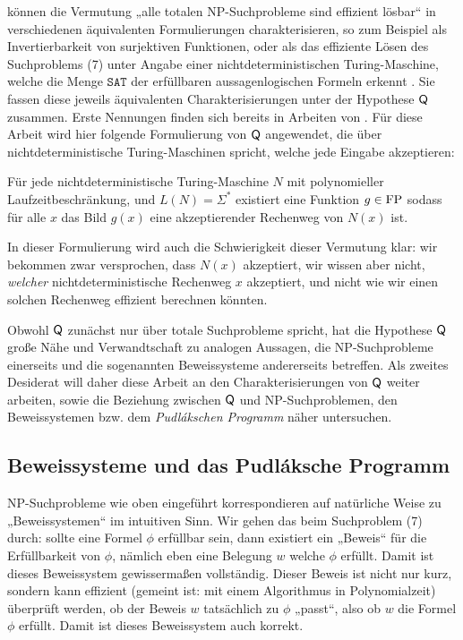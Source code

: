 \citeauthor{fenner_inverting_2003} können die Vermutung „alle totalen NP-Suchprobleme sind effizient lösbar“ in verschiedenen äquivalenten Formulierungen charakterisieren, so zum Beispiel als Invertierbarkeit von surjektiven Funktionen, oder als das effiziente Lösen des Suchproblems (7) unter Angabe einer nichtdeterministischen Turing-Maschine, welche die Menge $\mathtt{SAT}$ der erfüllbaren aussagenlogischen Formeln erkennt \parencite*{fenner_inverting_2003}.
Sie fassen diese jeweils äquivalenten Charakterisierungen unter der Hypothese $\hQ$ zusammen. Erste Nennungen finden sich bereits in Arbeiten von \textcite{fortnow_separability_1993}. Für diese Arbeit wird hier folgende Formulierung von  $\hQ$ angewendet, die über nichtdeterministische Turing-Maschinen spricht, welche jede Eingabe akzeptieren:
\begin{conjecture}[$\hQ$]\label{conj:q}
    Für jede nichtdeterministische Turing-Maschine $N$ mit polynomieller Laufzeitbeschränkung, und $L(N)=\Sigma^*$ existiert eine Funktion $g\in\mathrm{FP}$ sodass für alle $x$ das Bild $g(x)$ eine akzeptierender Rechenweg von $N(x)$ ist. 
\end{conjecture}
In dieser Formulierung wird auch die Schwierigkeit dieser Vermutung klar: wir bekommen zwar versprochen, dass $N(x)$ akzeptiert, wir wissen aber nicht, \emph{welcher} nichtdeterministische Rechenweg $x$ akzeptiert, und nicht wie wir einen solchen Rechenweg effizient berechnen könnten.

Obwohl $\hQ$ zunächst nur über totale Suchprobleme spricht, hat die Hypothese 
 $\hQ$ große Nähe und Verwandtschaft zu analogen Aussagen, die NP-Suchprobleme einerseits und die sogenannten Beweissysteme andererseits betreffen.
Als zweites Desiderat will daher diese Arbeit an den Charakterisierungen von $\hQ$ weiter arbeiten, sowie die Beziehung zwischen $\hQ$ und NP-Suchproblemen, den Beweissystemen \parencite[nach][]{cook_relative_1979} bzw. dem \emph{Pudlákschen Programm} \parencite*{pudlak_incompleteness_2017} näher untersuchen.


\subsection*{Beweissysteme und das Pudláksche Programm}

NP-Suchprobleme wie oben eingeführt korrespondieren auf natürliche Weise zu „Beweissystemen“ im intuitiven Sinn. Wir gehen das beim Suchproblem (7) durch: sollte eine Formel $\phi$ erfüllbar sein, dann existiert ein „Beweis“ für die Erfüllbarkeit von $\phi$, nämlich eben eine Belegung $w$ welche $\phi$ erfüllt. Damit ist dieses Beweissystem gewissermaßen vollständig.
Dieser Beweis ist nicht nur kurz, sondern kann effizient (gemeint ist: mit einem Algorithmus in Polynomialzeit) überprüft werden, ob der Beweis $w$ tatsächlich zu $\phi$ „passt“, also ob $w$ die Formel $\phi$ erfüllt. Damit ist dieses Beweissystem auch korrekt.

